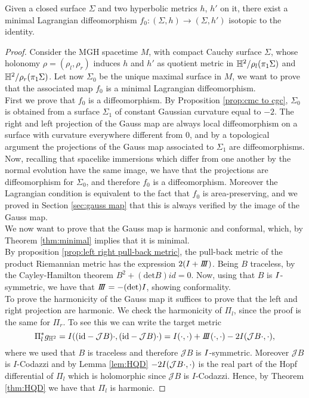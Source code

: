 \begin{theorem}\label{thm:existence}
    Given a closed surface $\Sigma$ and two hyperbolic metrics $h$, $h'$ on it, there exist a minimal Lagrangian diffeomorphism $f_0 : (\Sigma,h) \to (\Sigma,h')$ isotopic to the identity.
\end{theorem}
\begin{proof}
    Consider the MGH spacetime $M$, with compact Cauchy surface $\Sigma$, whose holonomy $\rho = (\rho_l, \rho_r)$ induces $h$ and $h'$ as quotient metric in $\mathbb{H}^2 / \rho_l(\pi_1 \Sigma)$ and $\mathbb{H}^2 / \rho_r(\pi_1 \Sigma)$. Let now $\Sigma_0$ be the unique maximal surface in $M$, we want to prove that the associated map $f_0$ is a minimal Lagrangian diffeomorphism.\\
    First we prove that $f_0$ is a diffeomorphism. By Proposition \ref{prop:cmc to cgc}, $\Sigma_0$ is obtained from a surface $\Sigma_1$ of constant Gaussian curvature equal to $-2$. The right and left projection of the Gauss map are always local diffeomorphism on a surface with curvature everywhere different from $0$, and by a topological argument the projections of the Gauss map associated to $\Sigma_1$ are diffeomorphisms. Now, recalling that spacelike immersions which differ from one another by the normal evolution have the same image, we have that the projections are diffeomorphism for $\Sigma_0$, and therefore $f_0$ is a diffeomorphism. Moreover the Lagrangian condition is equivalent to the fact that $f_0$ is area-preserving, and we proved in Section \ref{sec:gauss map} that this is always verified by the image of the Gauss map.\\
    We now want to prove that the Gauss map is harmonic and conformal, which, by Theorem \ref{thm:minimal} implies that it is minimal.\\
    By proposition \ref{prop:left right pull-back metric}, the pull-back metric of the product Riemannian metric has the expression $2(\I + \III)$. Being $B$ traceless, by the Cayley-Hamilton theorem $B^2 + (\text{det}B)id = 0$. Now, using that $B$ is $I$-symmetric, we have that $\III = -(\text{det})I$, showing conformality.\\
    To prove the harmonicity of the Gauss map it suffices to prove that the left and right projection are harmonic. We check the harmonicity of $\Pi_l$, since the proof is the same for $\Pi_r$. To see this we can write the target metric
    \[
        \Pi_l^*g_{\H^2}=I((\text{id}-\mathcal{J}B)\cdot,(\text{id}-\mathcal{J}B)\cdot) = \I(\cdot, \cdot) + \III(\cdot, \cdot) - 2\I(\mathcal{J}B \cdot, \cdot),
    \]
    where we used that $B$ is traceless and therefore $\mathcal{J}B$ is $I$-symmetric. Moreover $\mathcal{J} B$ is $I$-Codazzi and by Lemma \ref{lem:HQD} $- 2I(\mathcal{J}B \cdot, \cdot)$ is the real part of the Hopf differential of $\Pi_l$ which is holomorphic since $\mathcal{J}B$ is $I$-Codazzi. Hence, by Theorem \ref{thm:HQD} we have that $\Pi_l$ is harmonic.
\end{proof}

